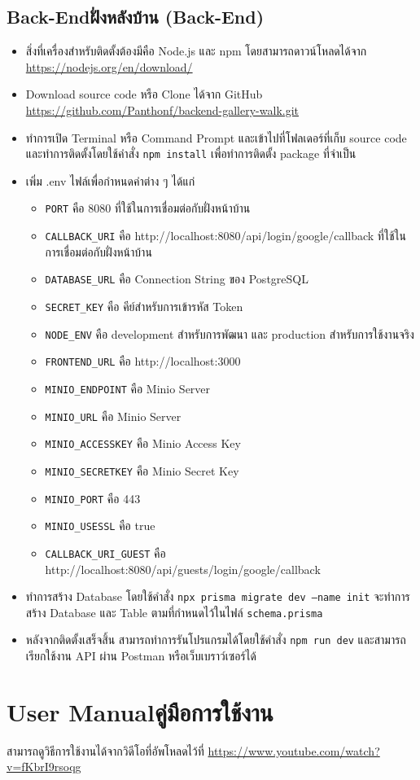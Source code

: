 \section{\ifenglish Back-End\else ฝั่งหลังบ้าน (Back-End)\fi}
\begin{itemize}
    \item สิ่งที่เครื่องสำหรับติดตั้งต้องมีคือ Node.js และ npm โดยสามารถดาวน์โหลดได้จาก \url{https://nodejs.org/en/download/}
    \item Download source code หรือ Clone ได้จาก GitHub \url{https://github.com/Panthonf/backend-gallery-walk.git}
    \item ทำการเปิด Terminal หรือ Command Prompt และเข้าไปที่โฟลเดอร์ที่เก็บ source code และทำการติดตั้งโดยใช้คำสั่ง \texttt{npm install} เพื่อทำการติดตั้ง package ที่จำเป็น
    \item เพิ่ม .env ไฟล์เพื่อกำหนดค่าต่าง ๆ ได้แก่
          \begin{itemize}
              \item \texttt{PORT} คือ 8080 ที่ใช้ในการเชื่อมต่อกับฝั่งหน้าบ้าน
              \item \texttt{CALLBACK\_URI} คือ http://localhost:8080/api/login/google/callback ที่ใช้ในการเชื่อมต่อกับฝั่งหน้าบ้าน
              \item \texttt{DATABASE\_URL} คือ Connection String ของ PostgreSQL
              \item \texttt{SECRET\_KEY} คือ คีย์สำหรับการเข้ารหัส Token
              \item \texttt{NODE\_ENV} คือ development สำหรับการพัฒนา และ production สำหรับการใช้งานจริง
              \item \texttt{FRONTEND\_URL} คือ http://localhost:3000
              \item \texttt{MINIO\_ENDPOINT} คือ Minio Server
              \item \texttt{MINIO\_URL} คือ Minio Server
              \item \texttt{MINIO\_ACCESSKEY} คือ Minio Access Key
              \item \texttt{MINIO\_SECRETKEY} คือ Minio Secret Key
              \item \texttt{MINIO\_PORT} คือ 443
              \item \texttt{MINIO\_USESSL} คือ true
              \item \texttt{CALLBACK\_URI\_GUEST} คือ http://localhost:8080/api/guests/login/google/callback
          \end{itemize}
    \item ทำการสร้าง Database โดยใช้คำสั่ง \texttt{npx prisma migrate dev --name init} จะทำการสร้าง Database และ Table ตามที่กำหนดไว้ในไฟล์ \texttt{schema.prisma}
    \item หลังจากติดตั้งเสร็จสิ้น สามารถทำการรันโปรแกรมได้โดยใช้คำสั่ง \texttt{npm run dev} และสามารถเรียกใช้งาน API ผ่าน Postman หรือเว็บเบราว์เซอร์ได้
\end{itemize}


\chapter{\ifenglish User Manual\else คู่มือการใช้งาน\fi}
สามารถดูวิธีการใช้งานได้จากวิดีโอที่อัพโหลดไว้ที่ \url{https://www.youtube.com/watch?v=fKbrI9rsoqg} 


